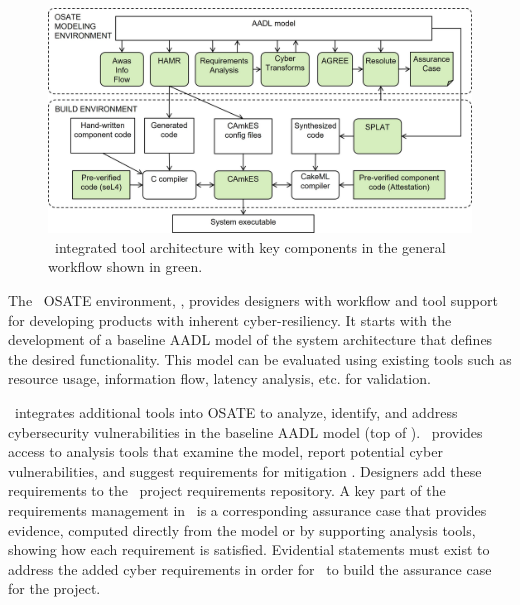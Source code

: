 \begin{figure}
	\begin{center}
	  \includegraphics[width=\textwidth]{./figs/tool-arch.jpg}
  	\end{center}
	\caption{\brfcs\ integrated tool architecture with key components in the general workflow shown in green.} 
	\label{fig:tool-arch} 
\end{figure}

The \brfcs\ OSATE environment, , provides designers with workflow and tool support for developing products with inherent cyber-resiliency.
It starts with the development of a baseline AADL model of the system architecture that defines the desired functionality.
This model can be evaluated using existing tools such as resource usage, information flow, latency analysis, etc. for validation.

\brfcs\ integrates additional tools into OSATE to analyze, identify, and address cybersecurity vulnerabilities in the baseline AADL model (top of ).
\brfcs\ provides access to analysis tools that examine the model, report potential cyber vulnerabilities,
and suggest requirements for mitigation \cite{dcrypps2019,gearcase2020}.
Designers add these requirements to the \brfcs\ project requirements repository. 
A key part of the requirements management in \brfcs\ is a corresponding assurance case that provides evidence, computed directly from the model or by supporting analysis tools, showing how each requirement is satisfied.
Evidential statements must exist to address the added cyber requirements in order for \brfcs\ to build the assurance case for the project.

